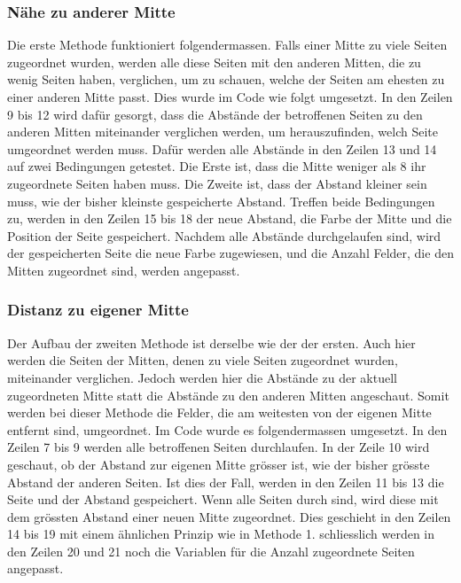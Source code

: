 \documentclass[a4paper, 12pt]{article}
\begin{document}
\subsubsection{Nähe zu anderer Mitte}
Die erste Methode funktioniert folgendermassen. Falls einer Mitte zu viele Seiten zugeordnet wurden, werden alle diese Seiten mit den anderen Mitten, die zu wenig Seiten haben, verglichen, um zu schauen, welche der Seiten am ehesten zu einer anderen Mitte passt. 
\newline
Dies wurde im Code wie folgt umgesetzt. In den Zeilen 9 bis 12 wird dafür gesorgt, dass die Abstände der betroffenen Seiten zu den anderen Mitten miteinander verglichen werden, um herauszufinden, welch Seite umgeordnet werden muss. Dafür werden alle Abstände in den Zeilen 13 und 14 auf zwei Bedingungen getestet. Die Erste ist, dass die Mitte weniger als 8 ihr zugeordnete Seiten haben muss. Die Zweite ist, dass der Abstand kleiner sein muss, wie der bisher kleinste gespeicherte Abstand. Treffen beide Bedingungen zu, werden in den Zeilen 15 bis 18 der neue Abstand, die Farbe der Mitte und die Position der Seite gespeichert. Nachdem alle Abstände durchgelaufen sind, wird der gespeicherten Seite die neue Farbe zugewiesen, und die Anzahl Felder, die den Mitten zugeordnet sind, werden angepasst.

\subsubsection{Distanz zu eigener Mitte}
Der Aufbau der zweiten Methode ist derselbe wie der der ersten. Auch hier werden die Seiten der Mitten, denen zu viele Seiten zugeordnet wurden, miteinander verglichen. Jedoch werden hier die Abstände zu der aktuell zugeordneten Mitte statt die Abstände zu den anderen Mitten angeschaut. Somit werden bei dieser Methode die Felder, die am weitesten von der eigenen Mitte entfernt sind, umgeordnet.
\newline
Im Code wurde es folgendermassen umgesetzt. In den Zeilen 7 bis 9 werden alle betroffenen Seiten durchlaufen. In der Zeile 10 wird geschaut, ob der Abstand zur eigenen Mitte grösser ist, wie der bisher grösste Abstand der anderen Seiten. Ist dies der Fall, werden in den Zeilen 11 bis 13 die Seite und der Abstand gespeichert. Wenn alle Seiten durch sind, wird diese mit dem grössten Abstand einer neuen Mitte zugeordnet. Dies geschieht in den Zeilen 14 bis 19 mit einem ähnlichen Prinzip wie in Methode 1. schliesslich werden in den Zeilen 20 und 21 noch die Variablen für die Anzahl zugeordnete Seiten angepasst.

\end{document}
